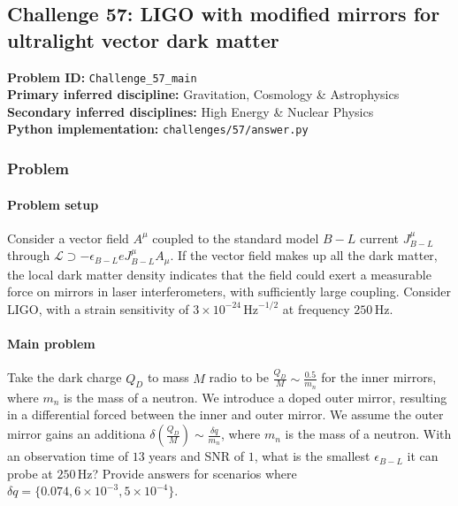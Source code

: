 \subsection[Challenge 57: LIGO with modified mirrors for ultralight vector dark matter]{Challenge 57: LIGO with modified mirrors for ultralight vector dark matter}
\textbf{Problem ID:} \texttt{Challenge\_57\_main}\\
\textbf{Primary inferred discipline:} Gravitation, Cosmology \& Astrophysics\\
\textbf{Secondary inferred disciplines:} High Energy \& Nuclear Physics\\
\textbf{Python implementation:} \texttt{challenges/57/answer.py}

\subsubsection*{Problem}
\paragraph*{Problem setup}
Consider a vector field $A^\mu$ coupled to the standard model $B-L$ current $J^\mu_{B-L}$ through $\mathcal{L}\supset -\epsilon_{B-L}eJ^\mu_{B-L} A_\mu$. If the vector field makes up all the dark matter, the local dark matter density indicates that the field could exert a measurable force on mirrors in laser interferometers, with sufficiently large coupling. Consider LIGO, with a strain sensitivity of $3\times 10^{-24}\, \text{Hz}^{-1/2}$ at frequency $250\,\text{Hz}$.

\paragraph*{Main problem}

Take the dark charge $Q_D$ to mass $M$ radio to be $\frac{Q_D}{M}\sim \frac{0.5}{m_n}$ for the inner mirrors, where $m_n$ is the mass of a neutron. We introduce a doped outer mirror, resulting in a differential forced between the inner and outer mirror. We assume the outer mirror gains an additiona $\delta \left(\frac{Q_D}{M}\right)\sim \frac{\delta q}{m_n}$, where $m_n$ is the mass of a neutron. With an observation time of $13$ years and SNR of $1$, what is the smallest $\epsilon_{B-L}$ it can probe at $250\,\text{Hz}$? Provide answers for scenarios where $\delta q=\{0.074, 6\times 10^{-3}, 5\times 10^{-4}\}$.


